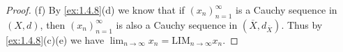 \begin{proof}{(f)}
  By \cref{ex:1.4.8}(d) we know that if \((x_n)_{n = 1}^\infty\) is a Cauchy sequence in \((X, d)\), then \((x_n)_{n = 1}^\infty\) is also a Cauchy sequence in \((\overline{X}, d_{\overline{X}})\).
  Thus by \cref{ex:1.4.8}(c)(e) we have \(\lim_{n \to \infty} x_n = \text{LIM}_{n \to \infty} x_n\).
\end{proof}